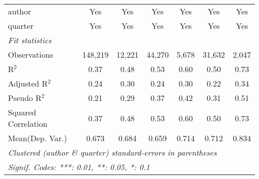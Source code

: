 \begin{tabular}{lcccccc}
   author                                                     & Yes           & Yes           & Yes           & Yes          & Yes           & Yes\\  
   quarter                                                    & Yes           & Yes           & Yes           & Yes          & Yes           & Yes\\  
   \midrule
   \emph{Fit statistics}\\
   Observations                                               & 148,219       & 12,221        & 44,270        & 5,678        & 31,632        & 2,047\\  
   R$^2$                                                      & 0.37          & 0.48          & 0.53          & 0.60         & 0.50          & 0.73\\  
   Adjusted R$^2$                                             & 0.24          & 0.30          & 0.24          & 0.30         & 0.22          & 0.34\\  
   Pseudo R$^2$                                               & 0.21          & 0.29          & 0.37          & 0.42         & 0.31          & 0.51\\  
   Squared Correlation                                        & 0.37          & 0.48          & 0.53          & 0.60         & 0.50          & 0.73\\  
Mean(Dep. Var.) & 0.673 & 0.684 & 0.659 & 0.714 & 0.712 & 0.834 \\
   \midrule \midrule
   \multicolumn{7}{l}{\emph{Clustered (author \& quarter) standard-errors in parentheses}}\\
   \multicolumn{7}{l}{\emph{Signif. Codes: ***: 0.01, **: 0.05, *: 0.1}}\\
\end{tabular}
\par\endgroup
